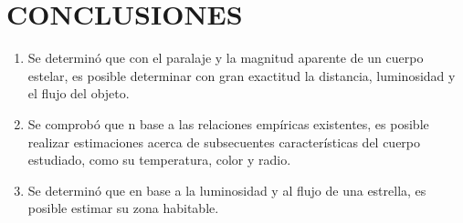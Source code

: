 \section*{CONCLUSIONES}\label{sec:conclusiones}
\begin{enumerate}
    \item Se determinó que con el paralaje y la magnitud aparente de un cuerpo estelar, es posible determinar con gran exactitud la distancia, luminosidad y el flujo del objeto.
    \item Se comprobó que n base a las relaciones empíricas existentes, es posible realizar estimaciones acerca de subsecuentes características del cuerpo estudiado, como su temperatura, color y radio.
    \item Se determinó que en base a la luminosidad y al flujo de una estrella, es posible estimar su zona habitable.
\end{enumerate}
